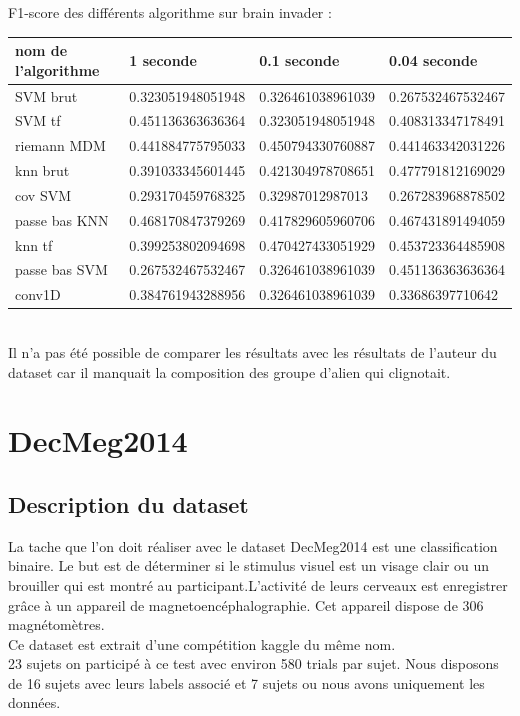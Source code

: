 \documentclass{article}
\begin{document}
F1-score des différents algorithme sur brain invader : \\
\begin{tabular}{|l|l|l|l|}
\hline
nom de l'algorithme                                                              & 1 seconde         & 0.1 seconde       & 0.04 seconde      \\
\hline
SVM brut      & 0.323051948051948 & 0.326461038961039 & 0.267532467532467 \\
SVM tf       & 0.451136363636364 & 0.323051948051948 & 0.408313347178491 \\
riemann MDM         & 0.441884775795033 & 0.450794330760887 & 0.441463342031226 \\
knn brut           & 0.391033345601445 & 0.421304978708651 & 0.477791812169029 \\
cov SVM       & 0.293170459768325 & 0.32987012987013  & 0.267283968878502 \\
passe bas KNN       & 0.468170847379269 & 0.417829605960706 & 0.467431891494059 \\
knn tf            & 0.399253802094698 & 0.470427433051929 & 0.453723364485908 \\
passe bas SVM & 0.267532467532467 & 0.326461038961039 & 0.451136363636364 \\
conv1D                & 0.384761943288956 & 0.326461038961039 & 0.33686397710642 \\
\hline
\end{tabular}
\\
Il n'a pas été possible de comparer les résultats avec les résultats de l'auteur du dataset car il manquait la composition des groupe d'alien qui clignotait.\\
\section{DecMeg2014}
\subsection{Description du dataset}
La tache que l'on doit réaliser avec le dataset DecMeg2014 est une classification binaire. Le but est de déterminer si le stimulus visuel est un visage clair ou un brouiller qui est montré au participant.L'activité de leurs cerveaux est enregistrer grâce à un appareil de magnetoencéphalographie. Cet appareil dispose de 306 magnétomètres.
\\
Ce dataset est extrait d'une compétition kaggle du même nom.
\\
23 sujets on participé à ce test avec environ 580 trials par sujet. Nous disposons de 16 sujets avec leurs labels associé et 7 sujets ou nous avons uniquement les données.
\end{document}
